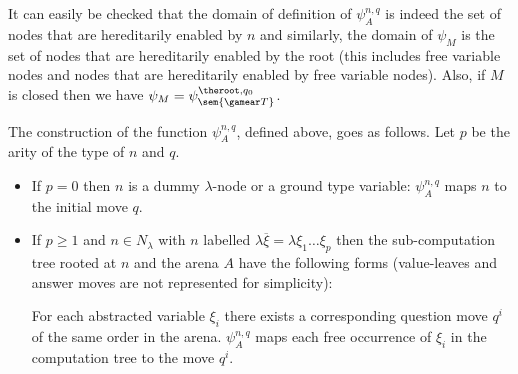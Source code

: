It can easily be checked that the domain of definition of $\psi^{n,q}_A$
is indeed the set of nodes that are hereditarily enabled by $n$ and similarly,
the domain of $\psi_M$ is the set of nodes that are hereditarily enabled by
the root (this includes free variable nodes and nodes that are hereditarily enabled by free variable nodes).
Also, if $M$ is closed then we have $\psi_M = \psi^{\theroot,q_0}_{\sem{\gamear T}}$.
\smallskip

The construction of the function $\psi^{n,q}_A$, defined above, goes as follows. Let $p$ be the arity of the type of $n$ and $q$.
\begin{itemize}
\item If $p=0$ then $n$ is a dummy $\lambda$-node or a ground type variable: $\psi^{n,q}_A$ maps $n$ to the initial move $q$.

\item  If $p\geq 1$ and $n \in N_{\lambda}$ with $n$ labelled $\lambda \overline{\xi} = \lambda \xi_1 \ldots \xi_p$ then the sub-computation tree rooted at $n$ and the
 arena $A$ have the following forms (value-leaves and answer
 moves are not represented for simplicity):
\begin{center}
\end{center}
    For each abstracted variable $\xi_i$ there exists a
    corresponding question move $q^i$ of the same order in the
    arena. $\psi^{n,q}_A$ maps each free occurrence of $\xi_i$
    in the computation tree to the move $q^i$.


\end{itemize}
